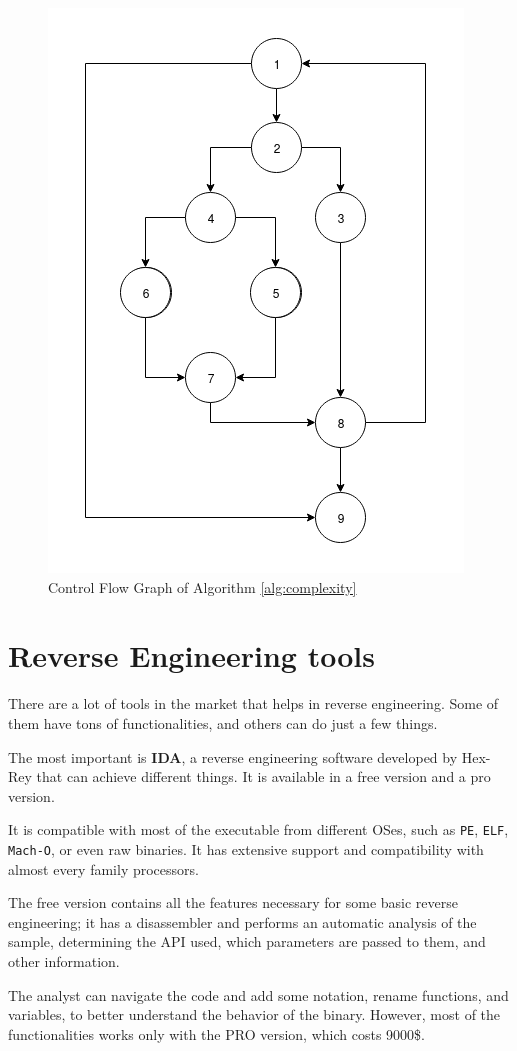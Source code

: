 \begin{figure}[!h]
	\centering
	\includegraphics[width=0.6\columnwidth]{complexity.png}
	\caption{Control Flow Graph of Algorithm \ref{alg:complexity}}
	\label{fig:complexity_ex}
\end{figure}


\section{Reverse Engineering tools}

There are a lot of tools in the market that helps in reverse engineering. Some of them have tons of functionalities, and others can do just a few things.

The most important is \textbf{IDA}, a reverse engineering software developed by Hex-Rey that can achieve different things. It is available in a free version and a pro version. 

It is compatible with most of the executable from different OSes, such as \texttt{PE}, \texttt{ELF}, \texttt{Mach-O}, or even raw binaries. It has extensive support and compatibility with almost every family processors.

The free version contains all the features necessary for some basic reverse engineering; it has a disassembler and performs an automatic analysis of the sample, determining the API used, which parameters are passed to them, and other information. 

The analyst can navigate the code and add some notation, rename functions, and variables, to better understand the behavior of the binary. However, most of the functionalities works only with the PRO version, which costs 9000\$.

